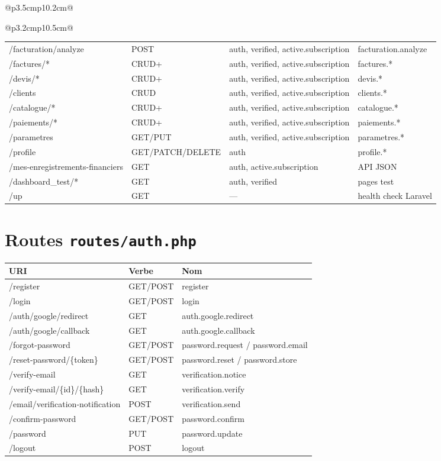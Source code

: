 \documentclass[11pt,a4paper]{report}
\begin{document}
\begin{longtable}{@{}p{3.5cm}p{10.2cm}@{}}
\begin{longtable}{@{}p{3.2cm}p{10.5cm}@{}}
\begin{longtable}{@{}p{5.8cm}p{1cm}p{2.2cm}p{5.5cm}@{}}
/facturation/analyze & POST & auth, verified, active.subscription & facturation.analyze \\
/factures/* & CRUD+ & auth, verified, active.subscription & factures.* \\
/devis/* & CRUD+ & auth, verified, active.subscription & devis.* \\
/clients & CRUD & auth, verified, active.subscription & clients.* \\
/catalogue/* & CRUD+ & auth, verified, active.subscription & catalogue.* \\
/paiements/* & CRUD+ & auth, verified, active.subscription & paiements.* \\
/parametres & GET/PUT & auth, verified, active.subscription & parametres.* \\
/profile & GET/PATCH/DELETE & auth & profile.* \\
/mes-enregistrements-financiers & GET & auth, active.subscription & API JSON \\
/dashboard\_test/* & GET & auth, verified & pages test \\
/up & GET & — & health check Laravel \\
\bottomrule
\end{longtable}
\endgroup

\section{Routes \texttt{routes/auth.php}}

\begingroup
\scriptsize
\begin{longtable}{@{}p{5.5cm}p{1cm}p{6.8cm}@{}}
\toprule
\textbf{URI} & \textbf{Verbe} & \textbf{Nom} \\
\midrule
/register & GET/POST & register \\
/login & GET/POST & login \\
/auth/google/redirect & GET & auth.google.redirect \\
/auth/google/callback & GET & auth.google.callback \\
/forgot-password & GET/POST & password.request / password.email \\
/reset-password/\{token\} & GET/POST & password.reset / password.store \\
/verify-email & GET & verification.notice \\
/verify-email/\{id\}/\{hash\} & GET & verification.verify \\
/email/verification-notification & POST & verification.send \\
/confirm-password & GET/POST & password.confirm \\
/password & PUT & password.update \\
/logout & POST & logout \\
\bottomrule
\end{longtable}
\endgroup


\end{longtable}
\end{longtable}
\end{document}
